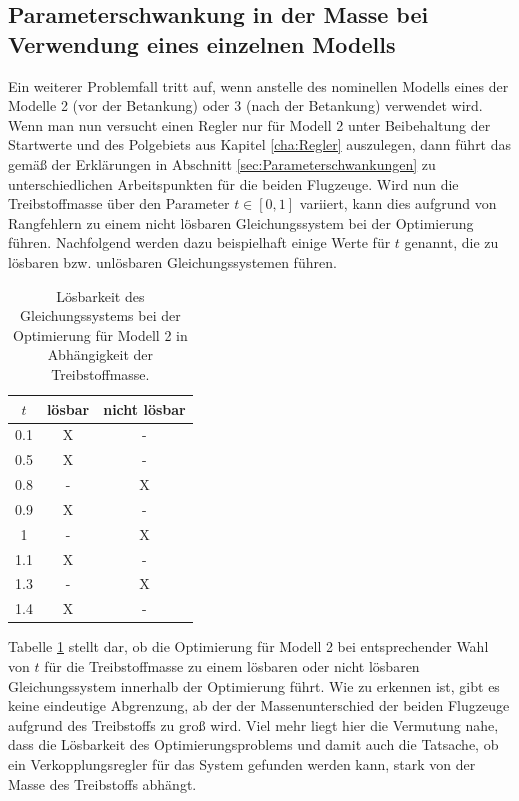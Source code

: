 \subsection{Parameterschwankung in der Masse bei Verwendung eines einzelnen Modells}
Ein weiterer Problemfall tritt auf, wenn anstelle des nominellen Modells eines der Modelle 2 (vor der Betankung) oder 3 (nach der Betankung) verwendet wird. Wenn man nun versucht einen Regler nur für Modell 2 unter Beibehaltung der Startwerte und des Polgebiets aus Kapitel \ref{cha:Regler} auszulegen, dann führt das gemäß der Erklärungen in Abschnitt \ref{sec:Parameterschwankungen} zu unterschiedlichen Arbeitspunkten für die beiden Flugzeuge. Wird nun die Treibstoffmasse über den Parameter $t\in[0,1]$ variiert, kann dies aufgrund von Rangfehlern zu einem nicht lösbaren Gleichungssystem bei der Optimierung führen. Nachfolgend werden dazu beispielhaft einige Werte für $t$ genannt, die zu lösbaren bzw. unlösbaren Gleichungssystemen führen.
\begin{table}[h]
\begin{center}
 \begin{tabular}{||c c c||} 
	\hline
	$t$ & lösbar & nicht lösbar \\ [0.5ex] 
	\hline
	0.1 & X & - \\
	0.5 & X & - \\
	0.8 & - & X \\
	0.9 & X & - \\
	1 & - & X \\
	1.1 & X & - \\
	1.3 & - & X \\
	1.4 & X & - \\
	\hline
\end{tabular}
\caption{\label{tab:parameterschwankung_t} Lösbarkeit des Gleichungssystems bei der Optimierung für Modell 2 in Abhängigkeit der Treibstoffmasse.}
\end{center}
\end{table} 
Tabelle \ref{tab:parameterschwankung_t} stellt dar, ob die Optimierung für Modell 2 bei entsprechender Wahl von $t$ für die Treibstoffmasse zu einem lösbaren oder nicht lösbaren Gleichungssystem innerhalb der Optimierung führt. Wie zu erkennen ist, gibt es keine eindeutige Abgrenzung, ab der der Massenunterschied der beiden Flugzeuge aufgrund des Treibstoffs zu groß wird. Viel mehr liegt hier die Vermutung nahe, dass die Lösbarkeit des Optimierungsproblems und damit auch die Tatsache, ob ein Verkopplungsregler für das System gefunden werden kann, stark von der Masse des Treibstoffs abhängt.

